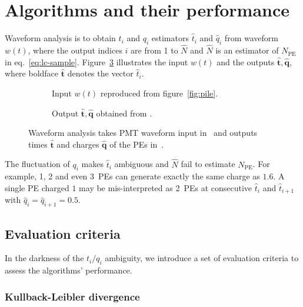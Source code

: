 \section{Algorithms and their performance}
\label{sec:algorithm}

Waveform analysis is to obtain $t_i$ and $q_i$ estimators $\hat{t}_i$ and $\hat{q}_i$ from waveform $w(t)$, where the output indices $i$ are from 1 to $\hat{N}$ and $\hat{N}$ is an estimator of $N_\mathrm{PE}$ in eq.~\eqref{eq:lc-sample}. Figure~\ref{fig:io} illustrates the input $w(t)$ and the outputs $\bm{\hat{t}}, \hat{\bm{q}}$, where boldface $\hat{\bm{t}}$ denotes the vector $\hat{t}_i$. 
\begin{figure}[H]
  \centering
  \begin{subfigure}{.45\textwidth}
    \resizebox{\textwidth}{!}{}
    \caption{\label{fig:input} Input $w(t)$ reproduced from figure~\ref{fig:pile}.}
  \end{subfigure}
  \begin{subfigure}{.45\textwidth}
    \resizebox{\textwidth}{!}{}
    \caption{\label{fig:output} Output $\hat{\bm{t}}, \hat{\bm{q}}$ obtained from .}
  \end{subfigure}
  \caption{\label{fig:io} Waveform analysis takes PMT waveform input in~ and outputs times $\hat{\bm{t}}$ and charges $\hat{\bm{q}}$ of the PEs in~. }
\end{figure}

The fluctuation of $q_i$ makes $\hat{t}_i$ ambiguous and $\hat{N}$ fail to estimate $N_\mathrm{PE}$. For example, 1, 2 and even 3~PEs can generate exactly the same charge as $1.6$.  A single PE charged $1$ may be mis-interpreted as 2~PEs at consecutive $\hat{t}_i$ and $\hat{t}_{i+1}$ with $\hat{q}_i=\hat{q}_{i+1}=0.5$.

\subsection{Evaluation criteria}
\label{sec:criteria}
In the darkness of the $t_i/q_i$ ambiguity, we introduce a set of evaluation criteria to assess the algorithms' performance.

\subsubsection{Kullback-Leibler divergence}
\label{sec:pseudo}

